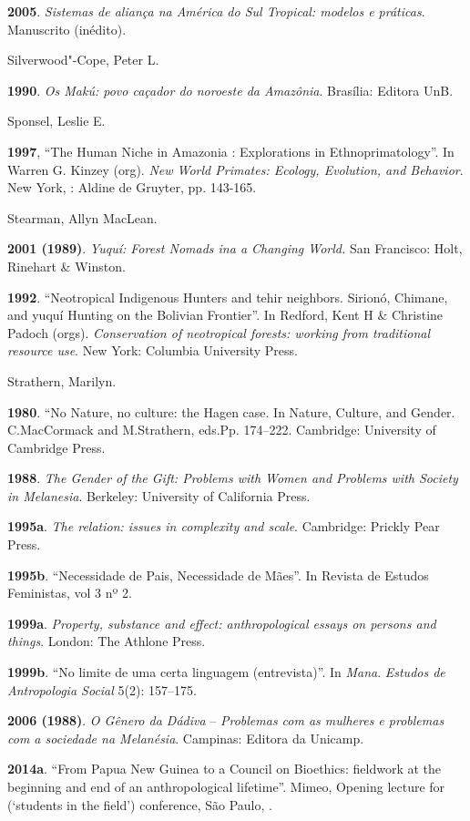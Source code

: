 \begin{Parskip}
\textbf{2005}. \emph{Sistemas de aliança na América do Sul Tropical:
modelos e práticas}. Manuscrito (inédito).

Silverwood"-Cope, Peter L.

\textbf{1990}. \emph{Os Makú: povo caçador do noroeste da Amazônia}.
Brasília: Editora UnB.

Sponsel, Leslie E.

\textbf{1997}, ``The Human Niche in Amazonia : Explorations in
Ethnoprimatology''. In Warren G. Kinzey (org). \emph{New World Primates:
Ecology, Evolution, and Behavior}. New York, : Aldine de Gruyter, pp.
143-165.

Stearman, Allyn MacLean.

\textbf{2001 (1989)}. \emph{Yuquí: Forest Nomads ina a Changing World.}
San Francisco: Holt, Rinehart \& Winston.

\textbf{1992}. ``Neotropical Indigenous Hunters and tehir neighbors.
Sirionó, Chimane, and yuquí Hunting on the Bolivian Frontier''. In
Redford, Kent H \& Christine Padoch (orgs). \emph{Conservation of
neotropical forests: working from traditional resource use}. New York:
Columbia University Press.

Strathern, Marilyn.

\textbf{1980}. ``No Nature, no culture: the Hagen case. In Nature,
Culture, and Gender. C.MacCormack and M.Strathern, eds.Pp. 174--222.
Cambridge: University of Cambridge Press.

\textbf{1988}. \emph{The Gender of the Gift: Problems with Women and
Problems with Society in Melanesia}. Berkeley: University of California
Press.

\textbf{1995a}. \emph{The relation: issues in complexity and scale}.
Cambridge: Prickly Pear Press.

\textbf{1995b}. ``Necessidade de Pais, Necessidade de Mães''. In Revista
de Estudos Feministas, vol 3 nº 2.

\textbf{1999a}. \emph{Property, substance and effect: anthropological
essays on persons and things}. London: The Athlone Press.

\textbf{1999b}. ``No limite de uma certa linguagem (entrevista)''. In
\emph{Mana}. \emph{Estudos de Antropologia Social} 5(2): 157--175.

\textbf{2006 (1988)}. \emph{O Gênero da Dádiva} -- \emph{Problemas com as
mulheres e problemas com a sociedade na Melanésia}. Campinas: Editora da
Unicamp.

\textbf{2014a}. ``From Papua New Guinea to a  Council on Bioethics:
fieldwork at the beginning and end of an anthropological lifetime''.
Mimeo, Opening lecture for   (`students in the field') conference,
São Paulo, .


\end{Parskip}
